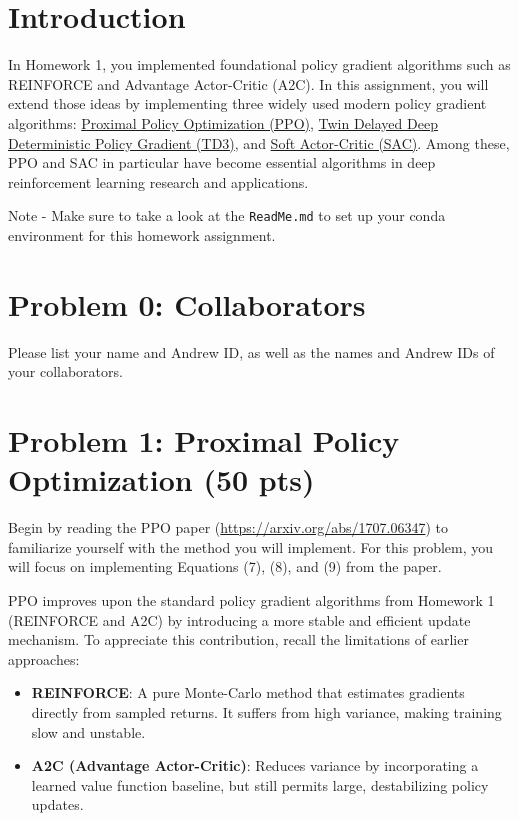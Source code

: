 \documentclass[12pt]{article}
\begin{document}
\newpage

\section*{Introduction}
In Homework 1, you implemented foundational policy gradient algorithms such as REINFORCE and Advantage Actor-Critic (A2C). In this assignment, you will extend those ideas by implementing three widely used modern policy gradient algorithms: \href{https://arxiv.org/abs/1707.06347}{Proximal Policy Optimization (PPO)}, \href{https://arxiv.org/abs/1802.09477}{Twin Delayed Deep Deterministic Policy Gradient (TD3)}, and \href{https://arxiv.org/abs/1801.01290}{Soft Actor-Critic (SAC)}. Among these, PPO and SAC in particular have become essential algorithms in deep reinforcement learning research and applications.

Note - Make sure to take a look at the \texttt{ReadMe.md} to set up your conda environment for this homework assignment.

\section*{Problem 0: Collaborators}
Please list your name and Andrew ID, as well as the names and Andrew IDs of your collaborators.

\section*{Problem 1: Proximal Policy Optimization (50 pts)}

Begin by reading the PPO paper (\url{https://arxiv.org/abs/1707.06347}) to familiarize yourself with the method you will implement. For this problem, you will focus on implementing Equations (7), (8), and (9) from the paper.

PPO improves upon the standard policy gradient algorithms from Homework 1 (REINFORCE and A2C) by introducing a more stable and efficient update mechanism. To appreciate this contribution, recall the limitations of earlier approaches:
\begin{itemize}
    \item \textbf{REINFORCE}: A pure Monte-Carlo method that estimates gradients directly from sampled returns. It suffers from high variance, making training slow and unstable.
    \item \textbf{A2C (Advantage Actor-Critic)}: Reduces variance by incorporating a learned value function baseline, but still permits large, destabilizing policy updates.
\end{itemize}
\end{document}
